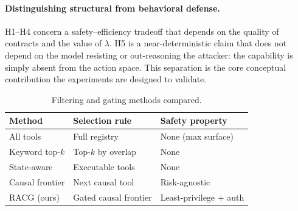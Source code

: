 \documentclass[conference,onecolumn]{IEEEtran}
\begin{document}
\paragraph{Distinguishing structural from behavioral defense.} H1--H4 concern a safety--efficiency tradeoff that depends on the quality of contracts and the value of $\lambda$. H5 is a near-deterministic claim that does not depend on the model resisting or out-reasoning the attacker: the capability is simply absent from the action space. This separation is the core conceptual contribution the experiments are designed to validate.


\begin{table}[t]
\centering
\footnotesize
\caption{Filtering and gating methods compared.}
\label{tab:methods}
\begin{tabularx}{\linewidth}{l Y L{2.4cm}}
\toprule
Method & Selection rule & Safety property \\
\midrule
All tools & Full registry & None (max surface) \\
Keyword top-$k$ & Top-$k$ by overlap & None \\
State-aware & Executable tools & None \\
Causal frontier & Next causal tool~\cite{anon2026cmtf} & Risk-agnostic \\
RACG (ours) & Gated causal frontier & Least-privilege + auth \\
\bottomrule
\end{tabularx}
\end{table}
\end{document}
